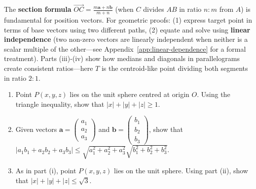 \begin{takeaways}
The \textbf{section formula} $\vec{OC} = \tfrac{m\mathbf{a} + n\mathbf{b}}{m+n}$ (when $C$ divides $AB$ in ratio $n:m$ from $A$) is fundamental for position vectors. For geometric proofs: (1) express target point in terms of base vectors using two different paths, (2) equate and solve using \textbf{linear independence} (two non-zero vectors are linearly independent when neither is a scalar multiple of the other---see Appendix~\ref{app:linear-dependence} for a formal treatment). Parts (iii)-(iv) show how medians and diagonals in parallelograms create consistent ratios—here $T$ is the centroid-like point dividing both segments in ratio $2:1$.
\end{takeaways}

\vspace{1em}

\begin{problem}
\begin{enumerate}[label=(\roman*)]
    \item Point $P(x,y,z)$ lies on the unit sphere centred at origin $O$. Using the triangle inequality, show that $|x| + |y| + |z| \geq 1$.
    \item Given vectors $\mathbf{a} = \begin{pmatrix} a_1 \\ a_2 \\ a_3 \end{pmatrix}$ and $\mathbf{b} = \begin{pmatrix} b_1 \\ b_2 \\ b_3 \end{pmatrix}$, show that
    $|a_1b_1 + a_2b_2 + a_3b_3| \leq \sqrt{a_1^2 + a_2^2 + a_3^2}\sqrt{b_1^2 + b_2^2 + b_3^2}$.
    \item As in part (i), point $P(x,y,z)$ lies on the unit sphere. Using part (ii), show that $|x| + |y| + |z| \leq \sqrt{3}$.
\end{enumerate}
\end{problem}

